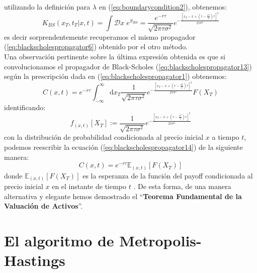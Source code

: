 \documentclass[11pt,a4paper]{article}
\begin{document}
utilizando la definici\'on para $\lambda$ en (\ref{eq:boundarycondition2}), obtenemos:
\begin{equation}
K_{BS}(x_T,t_T|x,t) = \int\mathcal{D}x \; e^{S_{BS}} = \frac{e^{-r\tau}}{\sqrt{2\pi\tau\sigma^2}}e^{- \frac{\left[ x_T - x + \left( r - \frac{\sigma^2}{2} \right)\tau \right]^2}{2\tau\sigma^2}}
\label{eq:blackscholespropagator13}
\end{equation}
es decir sorprendentemente recuperamos el mismo propagador (\ref{eq:blackscholespropagator6}) obtenido por el otro m\'etodo.\\
Una observaci\'on pertinente sobre la \'ultima expresi\'on obtenida es que si convolucionamos el propagador de Black-Scholes (\ref{eq:blackscholespropagator13}) seg\'un la prescripci\'on dada en (\ref{eq:blackscholespropagator1}) obtenemos:
\begin{equation}
C(x,t) = e^{-r\tau}\int_{-\infty}^{\infty}\mathrm{d}x_T \frac{1}{\sqrt{2\pi\tau\sigma^2}}e^{- \frac{\left[ x_T - x + \left( r - \frac{\sigma^2}{2} \right)\tau \right]^2}{2\tau\sigma^2}} F(X_T)
\label{eq:blackscholespropagator14}
\end{equation}
identificando:
\begin{equation}
f_{(x,t)}\left[X_T\right] := \frac{1}{\sqrt{2\pi\tau\sigma^2}}e^{- \frac{\left[ x_T - x + \left( r - \frac{\sigma^2}{2} \right)\tau \right]^2}{2\tau\sigma^2}}
\label{eq:pdf}
\end{equation}
con la distribuci\'on de probabilidad condicionada al precio inicial $x$ a tiempo $t$, podemos reescribir la ecuaci\'on (\ref{eq:blackscholespropagator14}) de la siguiente manera:
\begin{equation}
C(x,t) = e^{-r\tau}\mathbb{E}_{(x,t)}\left[F(X_T)\right]
\label{eq:blackscholespropagator15}
\end{equation}
donde $\mathbb{E}_{(x,t)}\left[F(X_T)\right]$ es la esperanza de la funci\'on del payoff condicionada al precio inicial $x$ en el instante de tiempo $t$ \cite{linetsky1997path}. De esta forma, de una manera alternativa y elegante hemos demostrado el ``\textbf{Teorema Fundamental de la Valuaci\'on de Activos}''.

\section{El algoritmo de Metropolis-Hastings}
\end{document}
